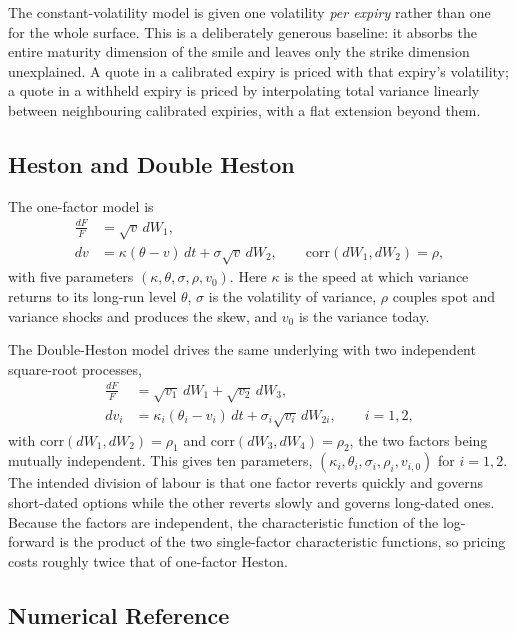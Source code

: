 \documentclass[runningheads]{llncs}
\begin{document}
The constant-volatility model is given one volatility \emph{per expiry} rather
than one for the whole surface. This is a deliberately generous baseline: it
absorbs the entire maturity dimension of the smile and leaves only the strike
dimension unexplained. A quote in a calibrated expiry is priced with that
expiry's volatility; a quote in a withheld expiry is priced by interpolating
total variance linearly between neighbouring calibrated expiries, with a flat
extension beyond them.

\subsection{Heston and Double Heston}

The one-factor model is
\begin{align}
\frac{dF}{F} &= \sqrt{v}\,dW_1, \\
dv &= \kappa(\theta - v)\,dt + \sigma\sqrt{v}\,dW_2,
\qquad \mathrm{corr}(dW_1,dW_2)=\rho,
\end{align}
with five parameters $(\kappa,\theta,\sigma,\rho,v_0)$. Here $\kappa$ is the
speed at which variance returns to its long-run level $\theta$, $\sigma$ is the
volatility of variance, $\rho$ couples spot and variance shocks and produces
the skew, and $v_0$ is the variance today.

The Double-Heston model drives the same underlying with two independent
square-root processes,
\begin{align}
\frac{dF}{F} &= \sqrt{v_1}\,dW_1 + \sqrt{v_2}\,dW_3, \\
dv_i &= \kappa_i(\theta_i - v_i)\,dt + \sigma_i\sqrt{v_i}\,dW_{2i},
\qquad i = 1,2,
\end{align}
with $\mathrm{corr}(dW_1,dW_2)=\rho_1$ and $\mathrm{corr}(dW_3,dW_4)=\rho_2$,
the two factors being mutually independent. This gives ten parameters,
$(\kappa_i,\theta_i,\sigma_i,\rho_i,v_{i,0})$ for $i=1,2$.
The intended division of labour is that one factor
reverts quickly and governs short-dated options while the other reverts slowly
and governs long-dated ones. Because the factors are independent, the
characteristic function of the log-forward is the product of the two
single-factor characteristic functions, so pricing costs roughly twice that of
one-factor Heston.

\subsection{Numerical Reference}
\end{document}
